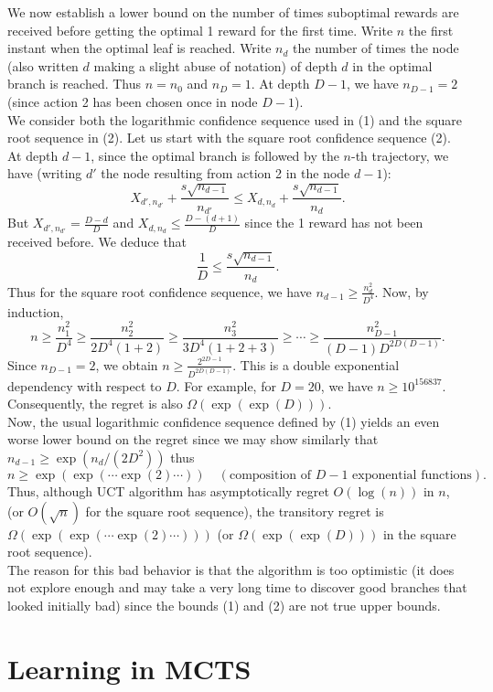 \documentclass[11pt]{article}
\theoremstyle{definitionstyle}
\begin{document}
We now establish a lower bound on the number of times suboptimal rewards are received before getting the optimal 1 reward for the first time. Write \(n\) the first instant when the optimal leaf is reached. Write \(n_d\) the number of times the node (also written \(d\) making a slight abuse of notation) of depth \(d\) in the optimal branch is reached. Thus \(n = n_0\) and \(n_D = 1\). At depth \(D - 1\), we have \(n_{D-1} = 2\) (since action 2 has been chosen once in node \(D - 1\)).\\
We consider both the logarithmic confidence sequence used in (1) and the square root sequence in (2). Let us start with the square root confidence sequence (2). At depth \(d - 1\), since the optimal branch is followed by the \(n\)-th trajectory, we have (writing \(d'\) the node resulting from action 2 in the node \(d - 1\)):
\[
X_{d',n_{d'}} + \frac{s\sqrt{n_{d-1}}}{n_{d'}} \leq X_{d,n_d} + \frac{s\sqrt{n_{d-1}}}{n_d}.
\]
But \(X_{d',n_{d'}} = \frac{D - d}{D}\) and \(X_{d,n_d} \leq \frac{D - (d + 1)}{D}\) since the 1 reward has not been received before. We deduce that
\[
\frac{1}{D} \leq \frac{s\sqrt{n_{d-1}}}{n_d}.
\]
Thus for the square root confidence sequence, we have \(n_{d-1} \geq \frac{n_d^2}{D^4}\). Now, by induction,
\[
n \geq \frac{n_1^2}{D^4} \geq \frac{n_2^2}{2D^4(1+2)} \geq \frac{n_3^2}{3D^4(1+2+3)} \geq \cdots \geq \frac{n_{D-1}^2}{(D-1)D^{2D(D-1)}}.
\]
Since \(n_{D-1} = 2\), we obtain \(n \geq \frac{2^{2D-1}}{D^{2D(D-1)}}\). This is a double exponential dependency with respect to \(D\). For example, for \(D = 20\), we have \(n \geq 10^{156837}\). Consequently, the regret is also \(\Omega(\exp(\exp(D)))\).\\
Now, the usual logarithmic confidence sequence defined by (1) yields an even worse lower bound on the regret since we may show similarly that \(n_{d-1} \geq \exp(n_d/(2D^2))\) thus
\[
n \geq \exp(\exp(\cdots \exp(2) \cdots)) \quad (\text{composition of } D - 1 \text{ exponential functions}).
\]
Thus, although UCT algorithm has asymptotically regret \(O(\log(n))\) in \(n\), (or \(O(\sqrt{n})\) for the square root sequence), the transitory regret is \(\Omega(\exp(\exp(\cdots \exp(2) \cdots)))\) (or \(\Omega(\exp(\exp(D)))\) in the square root sequence).\\
The reason for this bad behavior is that the algorithm is too optimistic (it does not explore enough and may take a very long time to discover good branches that looked initially bad) since the bounds (1) and (2) are not true upper bounds.\\
\section{Learning in MCTS}
\end{document}
